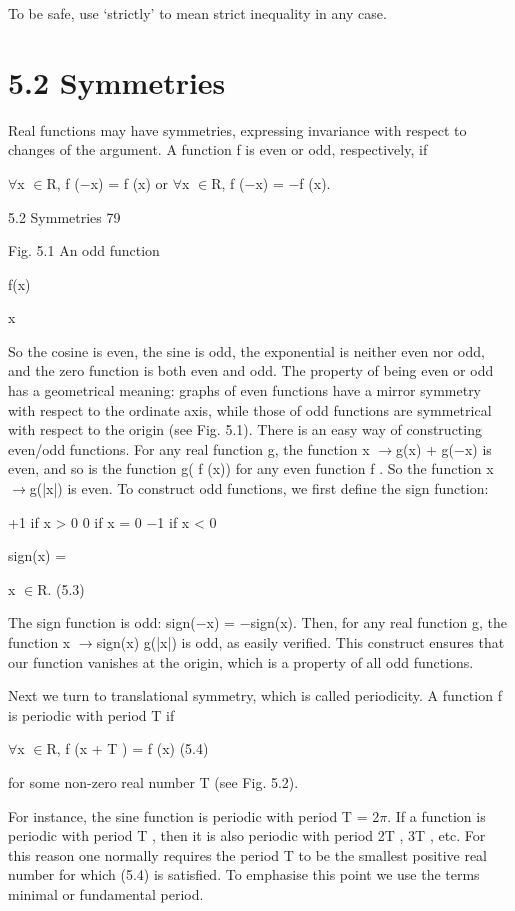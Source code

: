 \documentclass[11pt]{article}
\theoremstyle{plain}
\theoremstyle{definition}
\begin{document}
To be safe, use `strictly' to mean strict inequality in any case.

\section{5.2 Symmetries}

Real functions may have symmetries, expressing invariance with respect to changes of the argument. A function f is even or odd, respectively, if

$\forall$x $\in$R, f ($-$x) = f (x) or $\forall$x $\in$R, f ($-$x) = $-$f (x).

5.2 Symmetries 79

Fig. 5.1 An odd function

f(x)

x

So the cosine is even, the sine is odd, the exponential is neither even nor odd, and the zero function is both even and odd. The property of being even or odd has a geometrical meaning: graphs of even functions have a mirror symmetry with respect to the ordinate axis, while those of odd functions are symmetrical with respect to the origin (see Fig. 5.1). There is an easy way of constructing even/odd functions. For any real function g, the function x $\to$g(x) + g($-$x) is even, and so is the function g( f (x)) for any even function f . So the function x $\to$g(|x|) is even. To construct odd functions, we first define the sign function:

 

+1 if x > 0 0 if x = 0 $-$1 if x < 0

sign(x) =

x $\in$R. (5.3)



The sign function is odd: sign($-$x) = $-$sign(x). Then, for any real function g, the function x $\to$sign(x) g(|x|) is odd, as easily verified. This construct ensures that our function vanishes at the origin, which is a property of all odd functions.

Next we turn to translational symmetry, which is called periodicity. A function f is periodic with period T if

$\forall$x $\in$R, f (x + T ) = f (x) (5.4)

for some non-zero real number T (see Fig. 5.2).

For instance, the sine function is periodic with period T = 2$\pi$. If a function is periodic with period T , then it is also periodic with period 2T , 3T , etc. For this reason one normally requires the period T to be the smallest positive real number for which (5.4) is satisfied. To emphasise this point we use the terms minimal or fundamental period.
\end{document}
